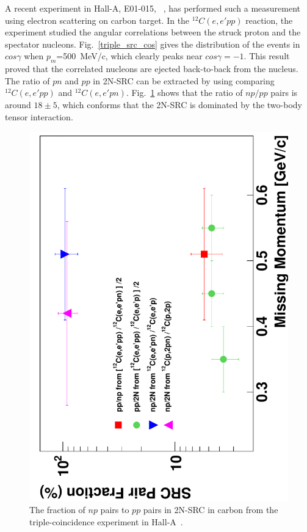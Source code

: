 A recent experiment in Hall-A, E01-015, ~\cite{PhysRevLett.99.072501,src_since}, has performed such a measurement using electron scattering on carbon target. In the $^{12}C(e,e'pp)$ reaction, the experiment studied the angular correlations between the struck proton and the spectator nucleons. Fig.~\ref{triple_src_cos} gives the distribution of the events in $cos\gamma$ when $p_{m}$=500~MeV/c, which clearly peaks near $cos\gamma=-1$. This result proved that the correlated nucleons are ejected back-to-back from the nucleus. The ratio of $pn$ and $pp$ in 2N-SRC can be extracted by using comparing $^{12}C(e,e'pp)$ and $^{12}C(e,e'pn)$. Fig.~\ref{triple_src_np} shows that the ratio of $np/pp$ pairs is around $18\pm 5$, which conforms that the 2N-SRC is dominated by the two-body tensor interaction. 
\begin{figure}[!ht]
  \begin{center}
    \includegraphics[type=pdf,angle=270,ext=.pdf,read=.pdf,width=0.60\linewidth]{./figures/physics/10yrSRC_fig7}
    \caption[The fraction of $np$ pairs to $pp$ pairs in 2N-SRC]{\footnotesize{The fraction of $np$ pairs to $pp$ pairs in 2N-SRC in carbon from the triple-coincidence experiment in Hall-A~\cite{src_since}.}}
    \label{triple_src_np}
  \end{center}
\end{figure} 

